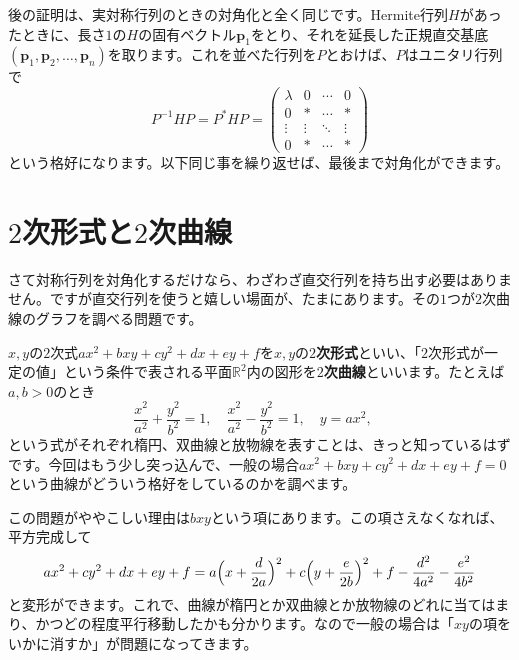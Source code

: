 後の証明は、実対称行列のときの対角化と全く同じです。Hermite行列$H$があったときに、長さ$1$の$H$の固有ベクトル$\bm{p}_1$をとり、それを延長した正規直交基底$(\bm{p}_1, \bm{p}_2, \ldots, \bm{p}_n)$を取ります。これを並べた行列を$P$とおけば、$P$はユニタリ行列で
\[
P^{-1} H P = P^* H P =
\begin{pmatrix}
\lambda & 0 & \cdots & 0 \\
0 & * & \cdots & * \\
\vdots & \vdots & \ddots & \vdots \\
0 & * & \cdots & *
\end{pmatrix}
\]
という格好になります。以下同じ事を繰り返せば、最後まで対角化ができます。

\section{$2$次形式と$2$次曲線}

さて対称行列を対角化するだけなら、わざわざ直交行列を持ち出す必要はありません。ですが直交行列を使うと嬉しい場面が、たまにあります。その$1$つが$2$次曲線のグラフを調べる問題です。

$x, y$の$2$次式$ax^2 + bxy + cy^2 + dx + ey + f$を$x, y$の\textbf{$2$次形式}といい、「$2$次形式が一定の値」という条件で表される平面$\mathbb{R}^2$内の図形を\textbf{$2$次曲線}といいます。たとえば$a, b > 0$のとき
\[
\frac{x^2}{a^2} + \frac{y^2}{b^2} = 1, \quad
\frac{x^2}{a^2} - \frac{y^2}{b^2} = 1, \quad
y = a x^2, \quad
\]
という式がそれぞれ楕円、双曲線と放物線を表すことは、きっと知っているはずです。今回はもう少し突っ込んで、一般の場合$ax^2 + bxy + cy^2 + dx + ey + f = 0$という曲線がどういう格好をしているのかを調べます。

この問題がややこしい理由は$bxy$という項にあります。この項さえなくなれば、平方完成して
\[
ax^2 + cy^2 + dx + ey + f = a \Bigl(x + \frac{d}{2a}\Bigr)^2 + c \Bigl(y + \frac{e}{2b}\Bigr)^2 + f - \frac{d^2}{4a^2} - \frac{e^2}{4b^2}
\]
と変形ができます。これで、曲線が楕円とか双曲線とか放物線のどれに当てはまり、かつどの程度平行移動したかも分かります。なので一般の場合は「$xy$の項をいかに消すか」が問題になってきます。


